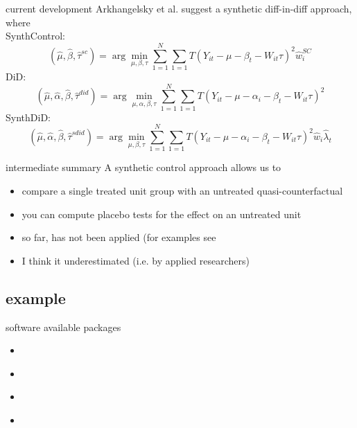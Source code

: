 \documentclass[aspectratio=169]{beamer}
\begin{document}
	\begin{current devs}
		\begin{frame}{current development}
			Arkhangelsky et al. \citeyear{Arkhangelsky2019} suggest a synthetic diff-in-diff approach, where \\ \vspace*{.15cm}
			SynthControl:
			\begin{equation}
				(\hat{\mu}, \hat{\beta}, \hat{\tau}^{sc}) = \arg\min_{\mu, \beta, \tau}  \sum_{1=1}^{N} \sum_{1=1}{T} \left(Y_{it} - \mu - \beta_t - W_{it}\tau \right)^2 \hat{w}_i^{SC}
			\end{equation}
			DiD:
			\begin{equation}
				(\hat{\mu}, \hat{\alpha}, \hat{\beta}, \hat{\tau}^{did}) = \arg\min_{\mu, \alpha, \beta, \tau}  \sum_{1=1}^{N} \sum_{1=1}{T} \left(Y_{it} - \mu - \alpha_i -\beta_t - W_{it}\tau \right)^2
			\end{equation}
			SynthDiD:
			\begin{equation}
				(\hat{\mu}, \hat{\alpha}, \hat{\beta}, \hat{\tau}^{sdid}) = \arg\min_{\mu, \beta, \tau}  \sum_{1=1}^{N} \sum_{1=1}{T} \left(Y_{it} - \mu - \alpha_i -\beta_t - W_{it}\tau \right)^2 \hat{w}_i \hat{\lambda}_t
			\end{equation}
		\end{frame}

		\begin{frame}{intermediate summary}
			A synthetic control approach allows us to \\ \vspace*{.5cm}
			\begin{itemize}
				\item compare a single treated unit group with an untreated quasi-counterfactual
				\item you can compute placebo tests for the effect on an untreated unit
				\item so far, has not been  applied (for examples see \cite{Abadie2020}
				\item I think it underestimated (i.e. by applied researchers)
			\end{itemize}
		\end{frame}

	\subsection{example}
		\begin{frame}{software}
			available packages
			\begin{itemize}
				\item \href{https://cran.r-project.org/web/packages/Synth/index.html}{\underline{}}
				\item \href{https://github.com/synth-inference/synthdid}{\underline{}}
				\item \href{https://github.com/hollina/scul/}{\underline{}}
				\item \href{https://yiqingxu.org/software/gsynth/gsynth_examples.html}{\underline{}}
			\end{itemize}
		\end{frame}


\end{current devs}
\end{document}

